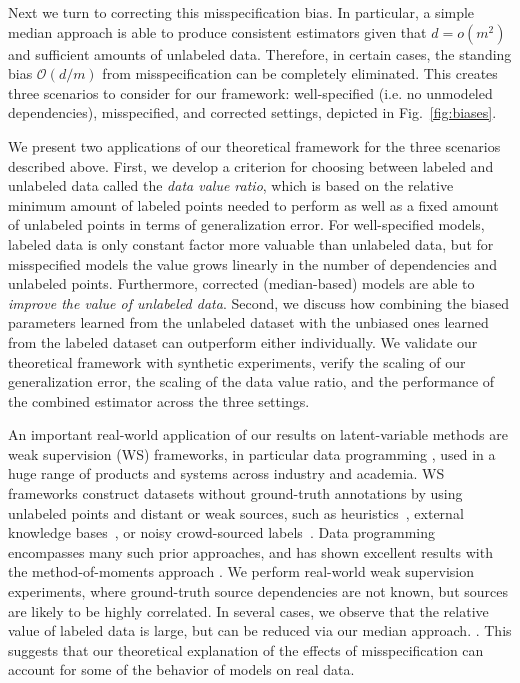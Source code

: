 Next we turn to correcting this misspecification bias. In particular, a simple median approach is able to produce consistent estimators given that $d = o(m^2)$ and sufficient amounts of unlabeled data. Therefore, in certain cases, the standing bias $\mathcal{O}(d/m)$ from misspecification can be completely eliminated. This creates three scenarios to consider for our framework: well-specified (i.e. no unmodeled dependencies), misspecified, and corrected settings, depicted in Fig.~\ref{fig:biases}.

We present two applications of our theoretical framework for the three scenarios described above. First, we develop a criterion for choosing between labeled and unlabeled data called the \textit{data value ratio}, which is based on the relative minimum amount of labeled points needed to perform as well as a fixed amount of unlabeled points in terms of generalization error. For well-specified models, labeled data is only constant factor more valuable than unlabeled data, but for misspecified models the value grows linearly in the number of dependencies and unlabeled points. Furthermore, corrected (median-based) models are able to \emph{improve the value of unlabeled data}. Second, we discuss how combining the biased parameters learned from the unlabeled dataset with the unbiased ones learned from the labeled dataset can outperform either individually. We validate our theoretical framework with  synthetic experiments, verify the scaling of our generalization error, the scaling of the data value ratio, and the performance of the combined estimator across the three settings. 

An important real-world application of our results on latent-variable methods are weak supervision (WS) frameworks, in particular data programming \citep{Ratner16}, used in a huge range of products and systems across industry and academia. WS frameworks construct datasets without ground-truth annotations by using unlabeled points and distant or weak sources, such as heuristics~\citep{gupta2014improved}, external knowledge bases~\citep{mintz2009distant,craven:ismb99,takamatsu:acl12}, or noisy crowd-sourced labels~\citep{karger2011iterative,dawid1979maximum}. Data programming encompasses many such prior approaches, and has shown excellent results with the method-of-moments approach \citep{fu2020fast}. We perform real-world weak supervision experiments, where ground-truth source dependencies are not known, but sources are likely to be highly correlated. In several cases, we observe that the relative value of labeled data is large, but can be reduced via our median approach. . This suggests that our theoretical explanation of the effects of misspecification can account for some of the behavior of models on real data.

